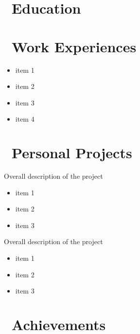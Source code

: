 \documentclass{resume}
\begin{document}



    \section{\faGraduationCap\ Education}

    \section{\faUser\ Work Experiences}
            \begin{itemize}
            \item item 1
            \item item 2
            \item item 3
            \item item 4
            \end{itemize}

    \section{\faGithubAlt\ Personal Projects}
        Overall description of the project
        \begin{itemize}
            \item item 1
            \item item 2
            \item item 3
        \end{itemize}

        Overall description of the project
        \begin{itemize}
            \item item 1
            \item item 2
            \item item 3
        \end{itemize}

    \section{\faHeartO\ Achievements}
\end{document}
